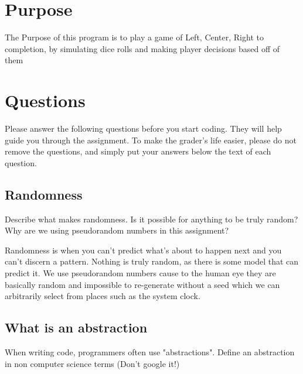 \documentclass{article}
\title{\ASSIGNMENT}
\author{\NAME}
\date{\CLASS}
\begin{document}
\pagestyle{fancy}
\fancyfoot{}
\fancyhead{}
\fancyfoot[L]{\ASSIGNMENT\ -- \CLASS\ -- \NAME}
\fancyfoot[R]{\thepage}

\maketitle



\section*{Purpose}
The Purpose of this program is to play a game of Left, Center, Right to completion, by simulating dice rolls and making player decisions based off of them

\section{Questions}

Please answer the following questions before you start coding. They will help guide you through the assignment. To make the grader's life easier, please do not remove the questions, and simply put your answers below the text of each question. 

\subsection{Randomness}

Describe what makes randomness. Is it possible for anything to be truly random? Why are we using pseudorandom numbers in this assignment?

Randomness is when you can't predict what's about to happen next and you can't discern a pattern. Nothing is truly random, as there is some model that can predict it. We use pseudorandom numbers cause to the human eye they are basically random and impossible to re-generate without a seed which we can arbitrarily select from places such as the system clock.

\subsection{What is an abstraction}

When writing code, programmers often use "abstractions". Define an abstraction in non computer science terms (Don't google it!)
\end{document}

